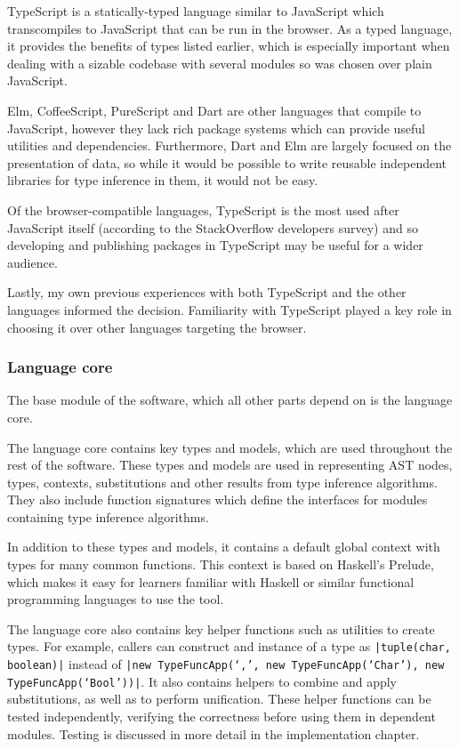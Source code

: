 \documentclass[a4paper,fleqn,12pt]{article}
\begin{document}
TypeScript is a statically-typed language similar to JavaScript which transcompiles to JavaScript that can be run in the browser. As a typed language, it provides the benefits of types listed earlier, which is especially important when dealing with a sizable codebase with several modules so was chosen over plain JavaScript.

Elm, CoffeeScript, PureScript and Dart are other languages that compile to JavaScript, however they lack rich package systems which can provide useful utilities and dependencies. Furthermore, Dart and Elm are largely focused on the presentation of data, so while it would be possible to write reusable independent libraries for type inference in them, it would not be easy.

Of the browser-compatible languages, TypeScript is the most used after JavaScript itself (according to the StackOverflow developers survey) and so developing and publishing packages in TypeScript may be useful for a wider audience.

Lastly, my own previous experiences with both TypeScript and the other languages informed the decision. Familiarity with TypeScript played a key role in choosing it over other languages targeting the browser.
\subsubsection{Language core}\label{id:h.hggmfighusoc}
The base module of the software, which all other parts depend on is the language core.

The language core contains key types and models, which are used throughout the rest of the software. These types and models are used in representing AST nodes, types, contexts, substitutions and other results from type inference algorithms. They also include function signatures which define the interfaces for modules containing type inference algorithms.

In addition to these types and models, it contains a default global context with types for many common functions. This context is based on Haskell’s Prelude, which makes it easy for learners familiar with Haskell or similar functional programming languages to use the tool.

The language core also contains key helper functions such as utilities to create types. For example, callers can construct and instance of a type as \texttt{|tuple(char, boolean)|} instead of \texttt{|new TypeFuncApp(‘,’, new TypeFuncApp(‘Char’), new TypeFuncApp(‘Bool’))|}. It also contains helpers to combine and apply substitutions, as well as to perform unification. These helper functions can be tested independently, verifying the correctness before using them in dependent modules. Testing is discussed in more detail in the implementation chapter.
\end{document}
